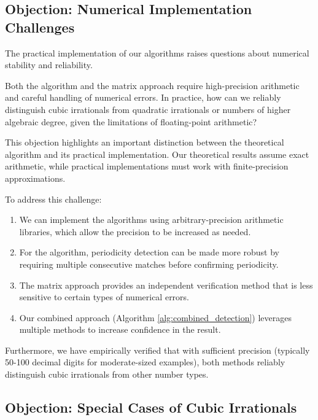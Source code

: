 \subsection{Objection: Numerical Implementation Challenges}

The practical implementation of our algorithms raises questions about numerical stability and reliability.

\begin{objection}
Both the \HAPD{} algorithm and the matrix approach require high-precision arithmetic and careful handling of numerical errors. In practice, how can we reliably distinguish cubic irrationals from quadratic irrationals or numbers of higher algebraic degree, given the limitations of floating-point arithmetic?
\end{objection}

\begin{response}
This objection highlights an important distinction between the theoretical algorithm and its practical implementation. Our theoretical results assume exact arithmetic, while practical implementations must work with finite-precision approximations.

To address this challenge:
\begin{enumerate}
    \item We can implement the algorithms using arbitrary-precision arithmetic libraries, which allow the precision to be increased as needed.
    \item For the \HAPD{} algorithm, periodicity detection can be made more robust by requiring multiple consecutive matches before confirming periodicity.
    \item The matrix approach provides an independent verification method that is less sensitive to certain types of numerical errors.
    \item Our combined approach (Algorithm \ref{alg:combined_detection}) leverages multiple methods to increase confidence in the result.
\end{enumerate}

Furthermore, we have empirically verified that with sufficient precision (typically 50-100 decimal digits for moderate-sized examples), both methods reliably distinguish cubic irrationals from other number types.
\end{response}

\subsection{Objection: Special Cases of Cubic Irrationals}

